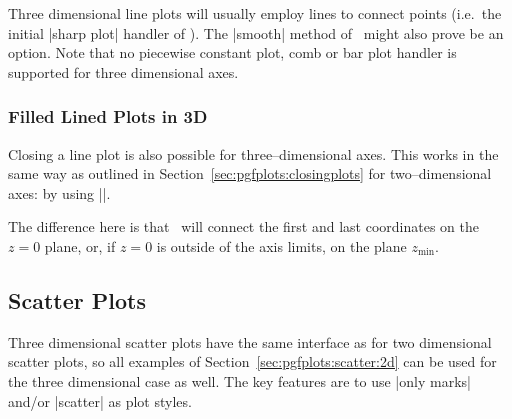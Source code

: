 {Three dimensional line plots will usually employ lines to connect points (i.e.\ the initial |sharp plot| handler of \Tikz). The |smooth| method of \Tikz\ might also prove be an option. Note that no piecewise constant plot, comb or bar plot handler is supported for three dimensional axes.

\subsubsection{Filled Lined Plots in 3D}
\label{sec:pgfplots:filled:line}
Closing a line plot is also possible for three--dimensional axes. This works in the same way as outlined in Section~\ref{sec:pgfplots:closingplots} for two--dimensional axes: by using |\closedcycle|.

\begin{codeexample}[]
\end{codeexample}

The difference here is that \PGFPlots\ will connect the first and last coordinates on the $z=0$ plane, or, if $z=0$ is outside of the axis limits, on the plane $z_{\text{min}}$.

\subsection{Scatter Plots}

Three dimensional scatter plots have the same interface as for two dimensional scatter plots, so all examples of Section~\ref{sec:pgfplots:scatter:2d} can be used for the three dimensional case as well. 
The key features are to use |only marks| and/or |scatter| as plot styles. 

}
